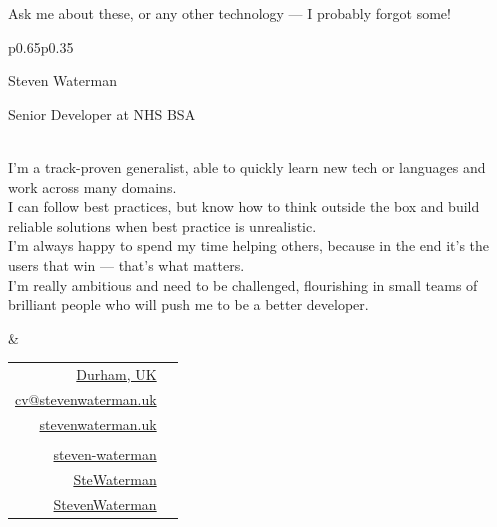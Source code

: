 \documentclass[hidelinks, 12pt, a4paper]{article}
\begin{document}
	\vspace{16pt}
	
	Ask me about these, or any other technology --- I probably forgot some!

	\newpage
	
	\begin{tabular}{p{0.65\textwidth}p{0.35\textwidth}}
		\begin{minipage}{\linewidth}
			\begin{Huge}Steven Waterman\end{Huge}
			
			\hspace{24pt}\begin{large}Senior Developer at NHS BSA\end{large}\\
			
			I'm a track-proven generalist, able to quickly learn new tech or languages and work across many domains.\\
			
			I can follow best practices, but know how to think outside the box and build reliable solutions when best practice is unrealistic.\\
			
			I'm always happy to spend my time helping others, because in the end it's the users that win --- that's what matters.\\
			
			I'm really ambitious and need to be challenged, flourishing in small teams of brilliant people who will push me to be a better developer.
		\end{minipage} & \vspace{-40pt}\begin{minipage}{\linewidth}
			\begin{flushright}
				\begin{tabular}{rc}
					\href{https://en.wikipedia.org/wiki/Durham,_England}{Durham, UK} & \href{https://en.wikipedia.org/wiki/Durham,_England}{\faHome} \\
					\href{mailto:cv@stevenwaterman.uk}{cv@stevenwaterman.uk} & \href{mailto:cv@stevenwaterman.uk}{\faEnvelope} \\
					\href{http://www.stevenwaterman.uk}{stevenwaterman.uk} & \href{http://www.stevenwaterman.uk}{\faLink} \\
					&\\
					\href{https://www.linkedin.com/in/steven-waterman/}{steven-waterman} & \href{https://www.linkedin.com/in/steven-waterman/}{\faLinkedin} \\
					\href{https://twitter.com/SteWaterman}{SteWaterman} & \href{https://twitter.com/SteWaterman}{\faTwitter} \\
					\href{https://github.com/stevenwaterman}{StevenWaterman} & \href{https://github.com/stevenwaterman}{\faGithub}
				\end{tabular}
			\end{flushright}
		\end{minipage}
	\end{tabular}
\end{document}

